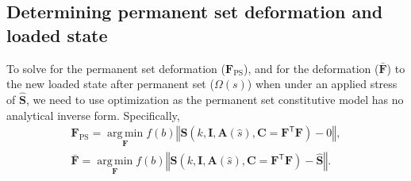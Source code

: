 
\subsection{Determining permanent set deformation and loaded state}
To solve for the permanent set deformation ($\mathbf{F}_\mathrm{PS}$), and for the deformation ($\bar{\mathbf{F}}$) to the new loaded state after permanent set ($\Omega(s)$) when under an applied stress of $\mathbf{\hat{S}}$, we need to use optimization as the permanent set constitutive model has no analytical inverse form. Specifically,
\begin{equation}\label{eq:optimization}
\begin{gathered}
\mathbf{F}_\mathrm{PS} = \operatorname*{arg\,min}_\mathbf{F} f(b) \left\Vert \mathbf{S}\left(k , \mathbf{I}, \mathbf{A}(\hat{s}), \mathbf{C}=\mathbf{F}^\mathsf{T}\mathbf{F}\right) - 0 \right\Vert, \\
\mathbf{\bar{F}} = \operatorname*{arg\,min}_\mathbf{F} f(b) \left\Vert \mathbf{S}\left(k , \mathbf{I}, \mathbf{A}(\hat{s}), \mathbf{C}=\mathbf{F}^\mathsf{T}\mathbf{F}\right) - \mathbf{\hat{S}} \right\Vert.
\end{gathered}
\end{equation}

